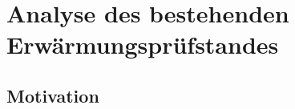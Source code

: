\section{Analyse des bestehenden Erwärmungsprüfstandes}
\label{chap:analyse_erwaermungspruefstand}


\subsection{Motivation}
\label{sec:motivation}